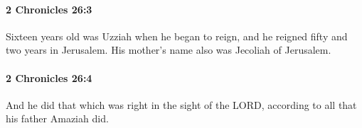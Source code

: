 		\paragraph{2 Chronicles 26:3} %
			\label{2CHRONICLES-26-3}

			Sixteen years old was Uzziah when he began to reign, and he reigned fifty and two years in Jerusalem. His mother's name also was Jecoliah of Jerusalem.


		\paragraph{2 Chronicles 26:4} %
			\label{2CHRONICLES-26-4}

			And he did that which was right in the sight of the LORD, according to all that his father Amaziah did.


